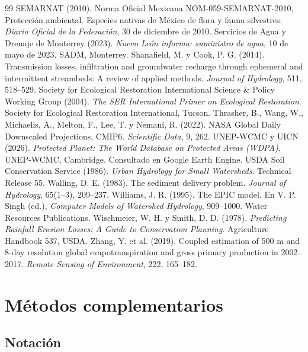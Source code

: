 \begin{thebibliography}{99}
 SEMARNAT (2010). Norma Oficial Mexicana NOM-059-SEMARNAT-2010, Protección ambiental. Especies nativas de México de flora y fauna silvestres. \emph{Diario Oficial de la Federación}, 30 de diciembre de 2010.
 Servicios de Agua y Drenaje de Monterrey (2023). \emph{Nuevo León informa: suministro de agua}, 10 de mayo de 2023. SADM, Monterrey.
 Shanafield, M. y Cook, P. G. (2014). Transmission losses, infiltration and groundwater recharge through ephemeral and intermittent streambeds: A review of applied methods. \emph{Journal of Hydrology}, 511, 518–529.
 Society for Ecological Restoration International Science \& Policy Working Group (2004). \emph{The SER International Primer on Ecological Restoration}. Society for Ecological Restoration International, Tucson.
 Thrasher, B., Wang, W., Michaelis, A., Melton, F., Lee, T. y Nemani, R. (2022). NASA Global Daily Downscaled Projections, CMIP6. \emph{Scientific Data}, 9, 262.
 UNEP-WCMC y UICN (2026). \emph{Protected Planet: The World Database on Protected Areas (WDPA)}. UNEP-WCMC, Cambridge. Consultado en Google Earth Engine.
 USDA Soil Conservation Service (1986). \emph{Urban Hydrology for Small Watersheds}. Technical Release 55.
 Walling, D. E. (1983). The sediment delivery problem. \emph{Journal of Hydrology}, 65(1–3), 209–237.
 Williams, J. R. (1995). The EPIC model. En V. P. Singh (ed.), \emph{Computer Models of Watershed Hydrology}, 909–1000. Water Resources Publications.
 Wischmeier, W. H. y Smith, D. D. (1978). \emph{Predicting Rainfall Erosion Losses: A Guide to Conservation Planning}. Agriculture Handbook 537, USDA.
 Zhang, Y. et al. (2019). Coupled estimation of 500 m and 8-day resolution global evapotranspiration and gross primary production in 2002–2017. \emph{Remote Sensing of Environment}, 222, 165–182.
\end{thebibliography}

\appendix
\section{Métodos complementarios}\label{ap:metodos}

\subsection{Notación}\label{ap:notacion}

